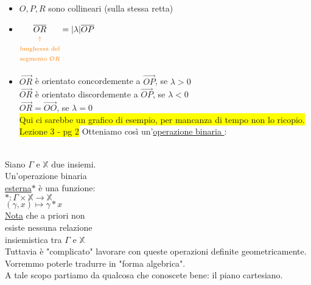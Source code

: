 \documentclass{article}
\newcommand{\hl}[1]{\colorbox{yellow}{#1}}
\newcommand{\ul}[1]{\underline{#1}}
\newcommand{\R}{\mathbb{R}}
\newcommand{\V}{\mathbb{V}}
\newcommand{\X}{\mathbb{X}}
\newcommand{\colort}[2]{\text{\color{#1}#2}}
\begin{document}
\begin{itemize}
		      \begin{itemize}
			      \item $O,P,R$ sono collineari (sulla stessa retta)
			      \item $\underset{\colort{orange}{$\begin{matrix}\uparrow\\\text{lunghezza del}\\\text{segmento }OR\end{matrix}$}}{\overline{OR}}=|\lambda|\overline{OP}$
			      \item $\overrightarrow{OR}$ è orientato concordemente a $\overrightarrow{OP}$, se $\lambda>0$\\
			            $\overrightarrow{OR}$ è orientato discordemente a $\overrightarrow{OP}$, se $\lambda<0$\\
			            $\overrightarrow{OR}=\overrightarrow{OO}$, se $\lambda=0$\\
			            \hl{Qui ci sarebbe un grafico di esempio, per mancanza di tempo non lo ricopio. Lezione 3 - pg 2}
			            Otteniamo così un'\ul{operazione binaria \colort{green}{esterna ($\R\not\subseteq\V$)}}:\\
			            \colort{purple}{$\cdot:\R\times\V\rightarrow \V$}\\
			            \hspace*{0.5em}\colort{purple}{$(\lambda,\overrightarrow{v})\rightarrow\lambda\cdot\overrightarrow{v}$}
		      \end{itemize}
	\end{itemize}
	{\color{orange}
	Siano $\Gamma$ e $\X$ due insiemi.\\
	Un'operazione binaria\\
	\ul{esterna}$\ast$ è una funzione:\vspace{1em}\\
$\ast:\Gamma\times\X\rightarrow \X$\\
	\hspace*{1.2em}$(\gamma,x)\mapsto\gamma\ast x$\vspace{1em}\\
	\ul{Nota} che a priori non\\
	esiste nessuna relazione\\
	insiemistica tra $\Gamma$ e $\X$
	}\\
	Tuttavia è "complicato" lavorare con queste operazioni definite geometricamente. Vorremmo poterle tradurre in "forma algebrica".\\
	A tale scopo partiamo da qualcosa che conoscete bene: il piano cartesiano.
\end{document}

